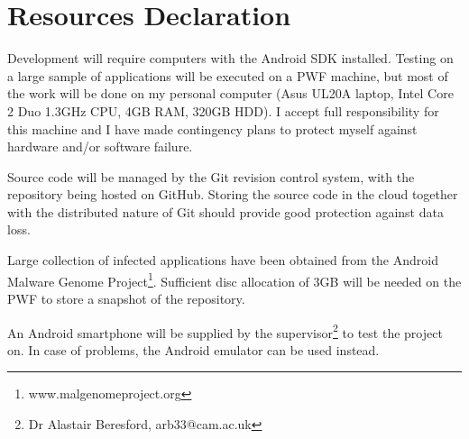 \documentclass[12pt]{article}
\begin{document}
\begin{itemize}
\end{itemize}

\section*{Resources Declaration}

Development will require computers with the Android SDK installed. 
Testing on a large sample of applications will be executed on a 
PWF machine, but most of the work will be done on my personal computer 
(Asus UL20A laptop, Intel Core 2 Duo 1.3GHz CPU, 4GB RAM, 320GB HDD). 
I accept full responsibility for this machine and I have made contingency 
plans to protect myself against hardware and/or software failure.

Source code will be managed by the Git revision control system, with
the repository being hosted on GitHub. Storing the source code in the
cloud together with the distributed nature of Git should provide
good protection against data loss.

Large collection of infected applications have been obtained from the
Android Malware Genome Project\footnote{www.malgenomeproject.org}. 
Sufficient disc allocation of 3GB will be needed on the PWF to store
a snapshot of the repository. 

An Android smartphone will be supplied by the supervisor\footnote
{Dr Alastair Beresford, arb33@cam.ac.uk} to test the project on. In case 
of problems, the Android emulator can be used instead.

\end{document}
